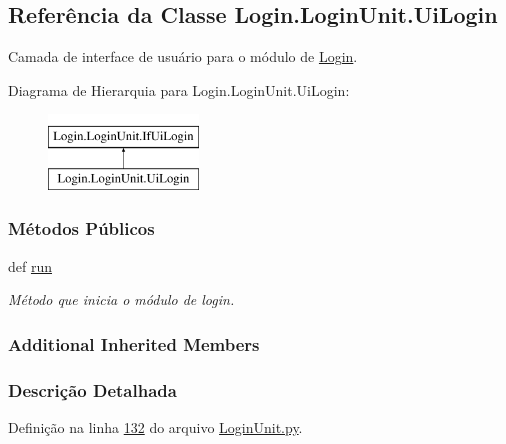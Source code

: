 \hypertarget{classLogin_1_1LoginUnit_1_1UiLogin}{\subsection{Referência da Classe Login.\-Login\-Unit.\-Ui\-Login}
\label{classLogin_1_1LoginUnit_1_1UiLogin}
}


Camada de interface de usuário para o módulo de \hyperlink{namespaceLogin}{Login}.  


Diagrama de Hierarquia para Login.\-Login\-Unit.\-Ui\-Login\-:\begin{figure}[H]
\begin{center}
\leavevmode
\includegraphics[height=2.000000cm]{de/da8/classLogin_1_1LoginUnit_1_1UiLogin}
\end{center}
\end{figure}
\subsubsection*{Métodos Públicos}
\begin{DoxyCompactItemize}
\item 
def \hyperlink{classLogin_1_1LoginUnit_1_1UiLogin_a9cd61a78d5ab0d201051ccf5898f86bc}{run}
\begin{DoxyCompactList}\small\item\em Método que inicia o módulo de login. \end{DoxyCompactList}\end{DoxyCompactItemize}
\subsubsection*{Additional Inherited Members}


\subsubsection{Descrição Detalhada}


Definição na linha \hyperlink{LoginUnit_8py_source_l00132}{132} do arquivo \hyperlink{LoginUnit_8py_source}{Login\-Unit.\-py}.



